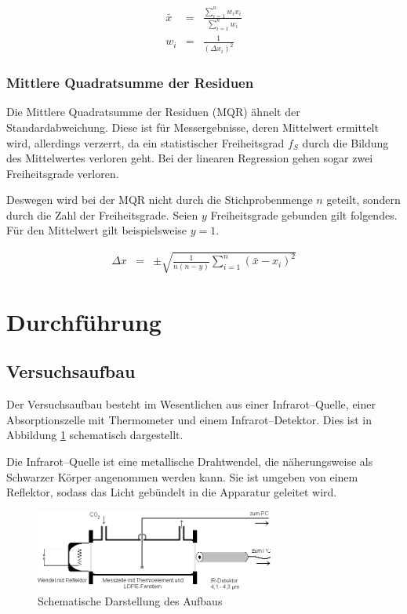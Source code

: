 \documentclass[12pt,a4paper]{scrartcl}
\numberwithin{equation}{section} %
\begin{document}
\begin{eqnarray}
    \bar{x} &=&
        \frac{\sum_{i=1}^n w_i x_i}{\sum_{i=1}^n w_i}\\
    w_i &=& \frac{1}{(\Delta x_i)^2}
\end{eqnarray}

\hypertarget{mittlere-quadratsumme-der-residuen}{%
\subsubsection{Mittlere Quadratsumme der Residuen}\label{mittlere-quadratsumme-der-residuen}}

Die Mittlere Quadratsumme der Residuen (MQR) ähnelt der Standardabweichung. Diese ist für Messergebnisse, deren Mittelwert ermittelt wird, allerdings verzerrt, da ein statistischer Freiheitsgrad $f_S$ durch die Bildung des Mittelwertes verloren geht. Bei der linearen Regression gehen sogar zwei Freiheitsgrade verloren.

Deswegen wird bei der MQR nicht durch die Stichprobenmenge $n$ geteilt, sondern durch die Zahl der Freiheitsgrade. Seien $y$ Freiheitsgrade gebunden gilt folgendes. Für den Mittelwert gilt beispielsweise $y=1$.

\begin{eqnarray}
    \Delta x &=& \pm\sqrt{\frac{1}{n(n - y)}\sum_{i=1}^n(\bar{x}-x_i)^2}
\end{eqnarray}

\clearpage
\hypertarget{durchfuxfchrung}{%
\section{Durchführung}\label{durchfuxfchrung}}
\subsection{Versuchsaufbau}
\label{Versuchsaufbau}

Der Versuchsaufbau besteht im Wesentlichen aus einer Infrarot--Quelle, einer Absorptionszelle mit Thermometer und einem Infrarot--Detektor. Dies ist in Abbildung \ref{abb:Aufbau} schematisch dargestellt.

Die Infrarot--Quelle ist eine metallische Drahtwendel, die näherungsweise als Schwarzer Körper angenommen werden kann. Sie ist umgeben von einem Reflektor, sodass das Licht gebündelt in die Apparatur geleitet wird.

\begin{figure}[h!]
	\centering
	\includegraphics[width=0.7\textwidth]{../media/B1.1/IR_Aufbau.png}
	\caption{Schematische Darstellung des Aufbaus \cite{UzK}}
	\label{abb:Aufbau}
\end{figure}
\end{document}
